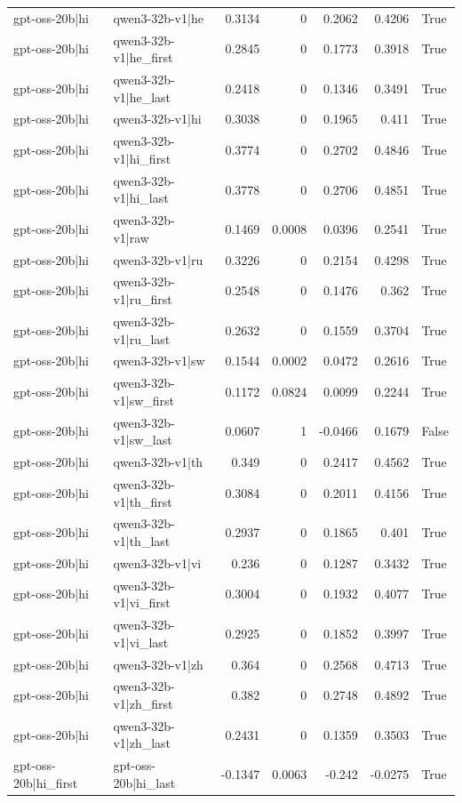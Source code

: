 \begin{table}
\begin{tabular}{l l r r r r l}
gpt-oss-20b|hi & qwen3-32b-v1|he & 0.3134 & 0 & 0.2062 & 0.4206 & True \\
gpt-oss-20b|hi & qwen3-32b-v1|he_first & 0.2845 & 0 & 0.1773 & 0.3918 & True \\
gpt-oss-20b|hi & qwen3-32b-v1|he_last & 0.2418 & 0 & 0.1346 & 0.3491 & True \\
gpt-oss-20b|hi & qwen3-32b-v1|hi & 0.3038 & 0 & 0.1965 & 0.411 & True \\
gpt-oss-20b|hi & qwen3-32b-v1|hi_first & 0.3774 & 0 & 0.2702 & 0.4846 & True \\
gpt-oss-20b|hi & qwen3-32b-v1|hi_last & 0.3778 & 0 & 0.2706 & 0.4851 & True \\
gpt-oss-20b|hi & qwen3-32b-v1|raw & 0.1469 & 0.0008 & 0.0396 & 0.2541 & True \\
gpt-oss-20b|hi & qwen3-32b-v1|ru & 0.3226 & 0 & 0.2154 & 0.4298 & True \\
gpt-oss-20b|hi & qwen3-32b-v1|ru_first & 0.2548 & 0 & 0.1476 & 0.362 & True \\
gpt-oss-20b|hi & qwen3-32b-v1|ru_last & 0.2632 & 0 & 0.1559 & 0.3704 & True \\
gpt-oss-20b|hi & qwen3-32b-v1|sw & 0.1544 & 0.0002 & 0.0472 & 0.2616 & True \\
gpt-oss-20b|hi & qwen3-32b-v1|sw_first & 0.1172 & 0.0824 & 0.0099 & 0.2244 & True \\
gpt-oss-20b|hi & qwen3-32b-v1|sw_last & 0.0607 & 1 & -0.0466 & 0.1679 & False \\
gpt-oss-20b|hi & qwen3-32b-v1|th & 0.349 & 0 & 0.2417 & 0.4562 & True \\
gpt-oss-20b|hi & qwen3-32b-v1|th_first & 0.3084 & 0 & 0.2011 & 0.4156 & True \\
gpt-oss-20b|hi & qwen3-32b-v1|th_last & 0.2937 & 0 & 0.1865 & 0.401 & True \\
gpt-oss-20b|hi & qwen3-32b-v1|vi & 0.236 & 0 & 0.1287 & 0.3432 & True \\
gpt-oss-20b|hi & qwen3-32b-v1|vi_first & 0.3004 & 0 & 0.1932 & 0.4077 & True \\
gpt-oss-20b|hi & qwen3-32b-v1|vi_last & 0.2925 & 0 & 0.1852 & 0.3997 & True \\
gpt-oss-20b|hi & qwen3-32b-v1|zh & 0.364 & 0 & 0.2568 & 0.4713 & True \\
gpt-oss-20b|hi & qwen3-32b-v1|zh_first & 0.382 & 0 & 0.2748 & 0.4892 & True \\
gpt-oss-20b|hi & qwen3-32b-v1|zh_last & 0.2431 & 0 & 0.1359 & 0.3503 & True \\
gpt-oss-20b|hi_first & gpt-oss-20b|hi_last & -0.1347 & 0.0063 & -0.242 & -0.0275 & True \\

\end{tabular}
\end{table}
